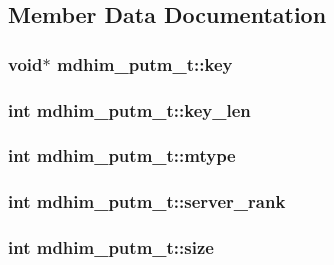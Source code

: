 \subsection{Member Data Documentation}
\hypertarget{structmdhim__putm__t_a6b5ee783b09f0039b09597e25005396e}{
\subsubsection[{key}]{\setlength{\rightskip}{0pt plus 5cm}void$\ast$ mdhim\-\_\-putm\-\_\-t\-::key}}\label{d6/dcd/structmdhim__putm__t_a6b5ee783b09f0039b09597e25005396e}
\hypertarget{structmdhim__putm__t_afbac7bbcd98d8489c502fbd6599964a0}{
\subsubsection[{key\-\_\-len}]{\setlength{\rightskip}{0pt plus 5cm}int mdhim\-\_\-putm\-\_\-t\-::key\-\_\-len}}\label{d6/dcd/structmdhim__putm__t_afbac7bbcd98d8489c502fbd6599964a0}
\hypertarget{structmdhim__putm__t_a632ccc930561029cfbbb28ec2b9929a4}{
\subsubsection[{mtype}]{\setlength{\rightskip}{0pt plus 5cm}int mdhim\-\_\-putm\-\_\-t\-::mtype}}\label{d6/dcd/structmdhim__putm__t_a632ccc930561029cfbbb28ec2b9929a4}
\hypertarget{structmdhim__putm__t_ad51fbdc39b6f3f8951b4e87a4f57e3bd}{
\subsubsection[{server\-\_\-rank}]{\setlength{\rightskip}{0pt plus 5cm}int mdhim\-\_\-putm\-\_\-t\-::server\-\_\-rank}}\label{d6/dcd/structmdhim__putm__t_ad51fbdc39b6f3f8951b4e87a4f57e3bd}
\hypertarget{structmdhim__putm__t_aa12607649b47c8489b4a79039b69c629}{
\subsubsection[{size}]{\setlength{\rightskip}{0pt plus 5cm}int mdhim\-\_\-putm\-\_\-t\-::size}}\label{d6/dcd/structmdhim__putm__t_aa12607649b47c8489b4a79039b69c629}
